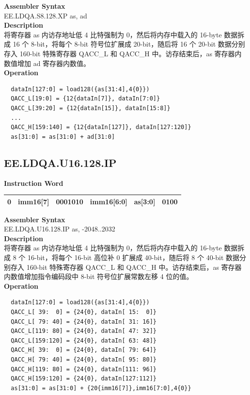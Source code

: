 \textbf{Assembler Syntax} \\
EE.LDQA.S8.128.XP as, ad \\
\textbf{Description} \\
将寄存器 as 内访存地址低 4 比特强制为 0，然后将内存中载入的 16-byte 数据拆成 16 个 8-bit，将每个 8-bit 符号位扩展成 20-bit，随后将 16 个 20-bit 数据分别存入 160-bit 特殊寄存器 QACC\_L 和 QACC\_H 中。访存结束后，as 寄存器内数值增加 ad 寄存器内数值。\\
\textbf{Operation}
\begin{lstlisting}
  dataIn[127:0] = load128({as[31:4],4{0}})
  QACC_L[19:0] = {12{dataIn[7]}, dataIn[7:0]}
  QACC_L[39:20] = {12{dataIn[15]}, dataIn[15:8]}
  ...
  QACC_H[159:140] = {12{dataIn[127]}, dataIn[127:120]}
  as[31:0] = as[31:0] + ad[31:0]
\end{lstlisting}

\clearpage
\subsection{EE.LDQA.U16.128.IP}\label{instruction:EELDQAU16128IP}
\setlength\tabcolsep{6pt}
\textbf{Instruction Word} \\
\begin{tabular}{|c|c|c|c|c|c|}
	\hline
	0 & imm16[7] & 0001010 & imm16[6:0] & as[3:0] & 0100 \\
	\hline
\end{tabular}

\textbf{Assembler Syntax} \\
EE.LDQA.U16.128.IP as, -2048..2032 \\
\textbf{Description} \\
将寄存器 as 内访存地址低 4 比特强制为 0，然后将内存中载入的 16-byte 数据拆成 8 个 16-bit，将每个 16-bit 高位补 0 扩展成 40-bit，随后将 8 个 40-bit 数据分别存入 160-bit 特殊寄存器 QACC\_L 和 QACC\_H 中。访存结束后，as 寄存器内数值增加指令编码段中 8-bit 符号位扩展常数左移 4 位的值。\\
\textbf{Operation}
\begin{lstlisting}
  dataIn[127:0] = load128({as[31:4],4{0}})
  QACC_L[ 39:  0] = {24{0}, dataIn[ 15:  0]}
  QACC_L[ 79: 40] = {24{0}, dataIn[ 31: 16]}
  QACC_L[119: 80] = {24{0}, dataIn[ 47: 32]}
  QACC_L[159:120] = {24{0}, dataIn[ 63: 48]}
  QACC_H[ 39:  0] = {24{0}, dataIn[ 79: 64]}
  QACC_H[ 79: 40] = {24{0}, dataIn[ 95: 80]}
  QACC_H[119: 80] = {24{0}, dataIn[111: 96]}
  QACC_H[159:120] = {24{0}, dataIn[127:112]}
  as[31:0] = as[31:0] + {20{imm16[7]},imm16[7:0],4{0}}
\end{lstlisting}

